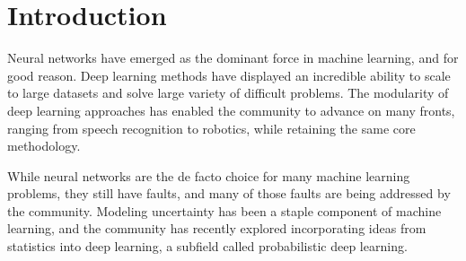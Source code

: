 \chapter{Introduction}

Neural networks have emerged
as the dominant force
in machine learning, 
and for good reason.
Deep learning methods
have displayed an incredible
ability to scale to large datasets
and solve large variety of
difficult problems.
The modularity of deep learning 
approaches has enabled the community
to advance on many fronts,
ranging from speech recognition
to robotics, while retaining
the same core methodology.

While neural networks 
are the de facto choice
for many machine learning problems,
they still have faults,
and many of those faults
are being addressed by the community.
Modeling uncertainty has been a staple
component of machine learning,
and the community
has recently explored
incorporating ideas
from statistics into deep learning,
a subfield called probabilistic deep learning.
